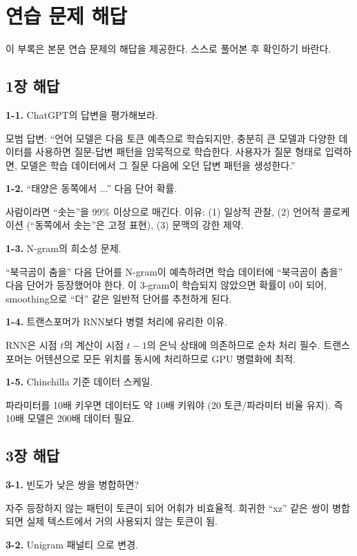 \chapter{연습 문제 해답}
\label{app:answers}

이 부록은 본문 연습 문제의 해답을 제공한다. 스스로 풀어본 후 확인하기 바란다.

\section{1장 해답}

\textbf{1-1.} ChatGPT의 답변을 평가해보라.

모범 답변: ``언어 모델은 다음 토큰 예측으로 학습되지만, 충분히 큰 모델과 다양한 데이터를 사용하면 질문-답변 패턴을 암묵적으로 학습한다. 사용자가 질문 형태로 입력하면, 모델은 학습 데이터에서 그 질문 다음에 오던 답변 패턴을 생성한다.''

\textbf{1-2.} ``태양은 동쪽에서 ...'' 다음 단어 확률.

사람이라면 ``솟는''을 99\% 이상으로 매긴다. 이유: (1) 일상적 관찰, (2) 언어적 콜로케이션 (``동쪽에서 솟는''은 고정 표현), (3) 문맥의 강한 제약.

\textbf{1-3.} N-gram의 희소성 문제.

``북극곰이 춤을'' 다음 단어를 N-gram이 예측하려면 학습 데이터에 ``북극곰이 춤을'' 다음 단어가 등장했어야 한다. 이 3-gram이 학습되지 않았으면 확률이 0이 되어, smoothing으로 ``더'' 같은 일반적 단어를 추천하게 된다.

\textbf{1-4.} 트랜스포머가 RNN보다 병렬 처리에 유리한 이유.

RNN은 시점 $t$의 계산이 시점 $t-1$의 은닉 상태에 의존하므로 순차 처리 필수. 트랜스포머는 어텐션으로 모든 위치를 동시에 처리하므로 GPU 병렬화에 최적.

\textbf{1-5.} Chinchilla 기준 데이터 스케일.

파라미터를 10배 키우면 데이터도 약 10배 키워야 (20 토큰/파라미터 비율 유지). 즉 10배 모델은 200배 데이터 필요.

\section{3장 해답}

\textbf{3-1.} 빈도가 낮은 쌍을 병합하면?

자주 등장하지 않는 패턴이 토큰이 되어 어휘가 비효율적. 희귀한 ``xz'' 같은 쌍이 병합되면 실제 텍스트에서 거의 사용되지 않는 토큰이 됨.

\textbf{3-2.} Unigram 패널티 으로 변경.

